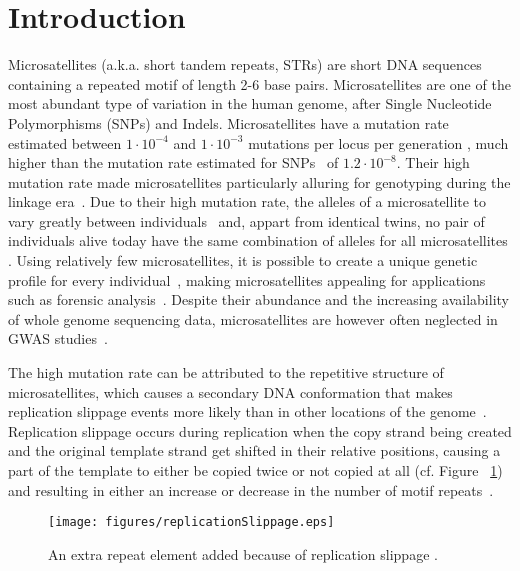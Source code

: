 \documentclass{bioinfo}
\begin{document}
\maketitle

\section{Introduction}
\label{s:intro}
Microsatellites (a.k.a. short tandem repeats, STRs) are short DNA sequences containing a repeated motif of length 2-6 base pairs.
Microsatellites are one of the most abundant type of variation in the human genome, after Single Nucleotide Polymorphisms (SNPs) and Indels.  
Microsatellites have a mutation rate estimated between
$1 \cdot 10^{-4}$ and $1 \cdot 10^{-3}$ mutations per locus per generation \cite{sun2012direct}, much higher than the mutation rate 
estimated for SNPs~\cite{KongSNPrate} of $1.2 \cdot 10^{-8}$.  Their high mutation rate made microsatellites particularly alluring 
for genotyping during the linkage era~\cite{LinkagePaper}.
Due to their high mutation rate, the alleles of a microsatellite to vary greatly between individuals~\cite{sun2012direct} and,  
appart from identical twins, no pair of individuals alive today have the same combination of alleles for all microsatellites \cite{Highnam2013}.
Using relatively few microsatellites, it is possible to create a unique genetic profile for every individual~\cite{NHGRI1999},
making microsatellites appealing for applications such as forensic analysis~\cite{forensicsMsat}.
Despite their abundance and the increasing availability of whole genome sequencing data, microsatellites are however often neglected 
in GWAS studies~\cite{Gudbjartsson2015}.

The high mutation rate can be attributed to the repetitive structure of microsatellites, which causes a secondary DNA conformation that 
makes replication slippage events more likely than in other locations of the genome~\cite{Mirkin2007}. 
Replication slippage occurs during replication when the copy strand being created and the original template strand get shifted in their relative 
positions, causing a part of the template to either be copied twice or not copied at all (cf. Figure ~\ref{fig:RepSlipp}) and resulting 
in either an increase or decrease in the number of motif repeats~\cite{Brown2002}.

\begin{figure}[ht]
\centering
 \texttt{[image: figures/replicationSlippage.eps]}
  \caption[Replication Slippage]{An extra repeat element added because of replication slippage \cite{Brown2002}.}
 \label{fig:RepSlipp}
\end{figure}
\end{document}
